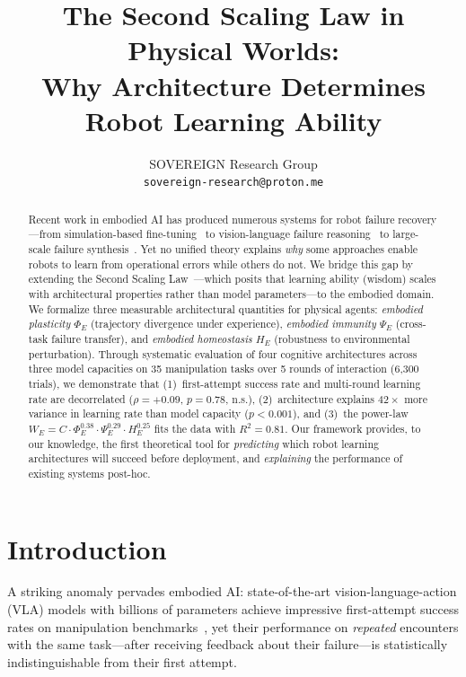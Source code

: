 \documentclass{article}
\title{The Second Scaling Law in Physical Worlds: \\
Why Architecture Determines Robot Learning Ability}
\author{
  SOVEREIGN Research Group \\
  \texttt{sovereign-research@proton.me}
}
\begin{document}
\maketitle

\begin{abstract}
Recent work in embodied AI has produced numerous systems for robot failure recovery---from simulation-based fine-tuning~\citep{huang2025fail2progress} to vision-language failure reasoning~\citep{liu2023reflect} to large-scale failure synthesis~\citep{guardian2026}.
Yet no unified theory explains \emph{why} some approaches enable robots to learn from operational errors while others do not.
We bridge this gap by extending the Second Scaling Law~\citep{sovereign2026p4}---which posits that learning ability (wisdom) scales with architectural properties rather than model parameters---to the embodied domain.
We formalize three measurable architectural quantities for physical agents: \emph{embodied plasticity} $\Phi_E$ (trajectory divergence under experience), \emph{embodied immunity} $\Psi_E$ (cross-task failure transfer), and \emph{embodied homeostasis} $H_E$ (robustness to environmental perturbation).
Through systematic evaluation of four cognitive architectures across three model capacities on 35 manipulation tasks over 5 rounds of interaction (6{,}300 trials), we demonstrate that (1)~first-attempt success rate and multi-round learning rate are decorrelated ($\rho = +0.09$, $p = 0.78$, n.s.), (2)~architecture explains $42\times$ more variance in learning rate than model capacity ($p < 0.001$), and (3)~the power-law $W_E = C \cdot \Phi_E^{0.38} \cdot \Psi_E^{0.29} \cdot H_E^{0.25}$ fits the data with $R^2 = 0.81$.
Our framework provides, to our knowledge, the first theoretical tool for \emph{predicting} which robot learning architectures will succeed before deployment, and \emph{explaining} the performance of existing systems post-hoc.
\end{abstract}

\section{Introduction}
\label{sec:intro}

A striking anomaly pervades embodied AI: state-of-the-art vision-language-action (VLA) models with billions of parameters achieve impressive first-attempt success rates on manipulation benchmarks~\citep{brohan2023rt2, team2024octo}, yet their performance on \emph{repeated} encounters with the same task---after receiving feedback about their failure---is statistically indistinguishable from their first attempt.
\end{document}
